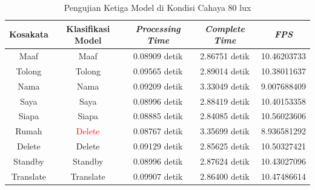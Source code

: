 \begin{longtable}{|c|c|c|c|c|}
  \caption{Pengujian Ketiga Model di Kondisi Cahaya 80 lux}
  \label{tb:prediksiremang3}                                   \\
  \hline
  \rowcolor[HTML]{C0C0C0}
  \textbf{Kosakata} & \textbf{Klasifikasi Model} & \textbf{\emph{Processing Time}} & \textbf{\emph{Complete Time}} & \textbf{\emph{FPS}}\\
  \hline
  Maaf              & Maaf                          & 0.08909 detik                           & 2.86751 detik                                  & 10.46203733\\
  Tolong            & Tolong                        & 0.09565 detik                           & 2.89014 detik                                  & 10.38011637\\
  Nama              & Nama                          & 0.09209 detik                           & 3.33049 detik                                  & 9.007688409\\
  Saya              & Saya                          & 0.08996 detik                           & 2.88419 detik                                  & 10.40153358\\
  Siapa             & Siapa                         & 0.08885 detik                           & 2.84085 detik                                  & 10.56023606\\
  Rumah             & \textcolor{red}{Delete}       & 0.08767 detik                           & 3.35699 detik                                  & 8.936581292\\
  Delete            & Delete                        & 0.09129 detik                           & 2.85625 detik                                  & 10.50327421\\
  Standby           & Standby                       & 0.08996 detik                           & 2.87624 detik                                  & 10.43027096\\
  Translate         & Translate                     & 0.09907 detik                           & 2.86400 detik                                  & 10.47486614\\
  \hline
\end{longtable}



